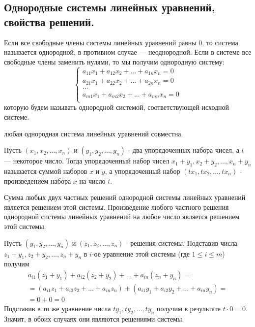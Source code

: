 \documentclass[a4paper,14pt]{article}
\begin{document}
\subsection{Однородные системы линейных уравнений, свойства решений.}
Если все свободные члены системы линейных уравнений равны 0, то система называется однородной, в противном случае — неоднородной. Если в системе все свободные члены заменить нулями, то мы получим
однородную систему:
\[
\begin{cases}
a_{11}x_1 + a_{12}x_2 + ... + a_{1n}x_n = 0 \\
a_{21}x_1 + a_{22}x_2 + ... + a_{2n}x_n = 0 \\
... \\
a_{m1}x_1 + a_{m2}x_2 + ... + a_{mn}x_n = 0 \\
\end{cases}
\]
которую будем называть однородной системой, соответствующей исходной системе.
\begin{remark}
	любая однородная система линейных уравнений совместна.
\end{remark}
\begin{definition}
	Пусть $(x_1, x_2, ..., x_n) \text{ и } (y_1, y_2, ..., y_n)$ - два упорядоченных набора чисел, а $t$ — некоторое число. Тогда упорядоченный набор чисел $x_1 + y_1, x_2 + y_2, ..., x_n + y_n$ называется суммой наборов $x$ и $y$, а упорядоченный набор $(tx_1, tx_2, ..., tx_n)$ - произведением набора $x$ на число $t$.
\end{definition}
\begin{theorem}
	Сумма любых двух частных решений однородной системы линейных уравнений является решением этой системы. Произведение любого частного решения однородной системы линейных уравнений на любое число является решением этой системы.
	\begin{evidence}
		Пусть $(y_1, y_2, ..., y_n)$ и $(z_1, z_2, ..., z_n)$ - решения системы. Подставив числа $z_1 + y_1, z_2 + y_2, ..., z_n + y_n$ в $i$-ое уравнение этой системы (где $1 \le i \le m$) получим
		\begin{multline}
			a_{i1}(z_1 + y_1) + a_{i2}(z_2 + y_2) + ... + a_{in}(z_n + y_n) = \\
			= (a_{i1}z_1 + a_{i2}z_2 + ... + a_{in}z_n) + (a_{i1}y_1 + a_{i2}y_2 + ... + a_{in}y_n) = \\ 
			= 0 + 0 = 0
		\end{multline}
		Подставив в то же уравнение числа $ty_1, ty_2, ..., ty_n$ получим в результате $t \cdot 0 = 0$. Значит, в обоих случаях они являются решениями системы.
	\end{evidence}
\end{theorem}
\end{document}
